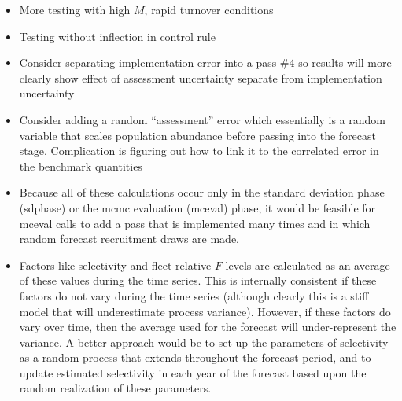 \begin{itemize}
	\item More testing with high $M$, rapid turnover conditions
	\item Testing without inflection in control rule
	\item Consider separating implementation error into a pass \#4 so results will more clearly show effect of assessment uncertainty separate from implementation uncertainty
	\item Consider adding a random ``assessment'' error which essentially is a random variable that scales population abundance before passing into the forecast stage. Complication is figuring out how to link it to the correlated error in the benchmark quantities
	\item Because all of these calculations occur only in the standard deviation phase (sdphase) or the \gls{mcmc} evaluation (mceval) phase, it would be feasible for mceval calls to add a pass that is implemented many times and in which random forecast recruitment draws are made.
	\item Factors like selectivity and fleet relative $F$ levels are calculated as an average of these values during the time series. This is internally consistent if these factors do not vary during the time series (although clearly this is a stiff model that will underestimate process variance). However, if these factors do vary over time, then the average used for the forecast will under-represent the variance. A better approach would be to set up the parameters of selectivity as a random process that extends throughout the forecast period, and to update estimated selectivity in each year of the forecast based upon the random realization of these parameters.
\end{itemize}

	
